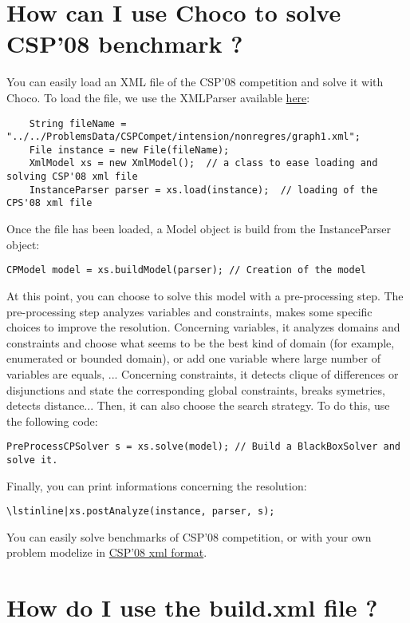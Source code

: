 \section{How can I use Choco to solve CSP'08 benchmark ?}\label{faq:howcaniusechocotosolvecsp'08benchmark}\hypertarget{faq:howcaniusechocotosolvecsp'08benchmark}{}
You can easily load an XML file of the CSP'08 competition and solve it with Choco.
To load the file, we use the XMLParser available \href{http://www.cril.univ-artois.fr/\~{}lecoutre/research/tools/tools.html}{here}:
\begin{lstlisting}
	String fileName = "../../ProblemsData/CSPCompet/intension/nonregres/graph1.xml";
	File instance = new File(fileName);
	XmlModel xs = new XmlModel();  // a class to ease loading and solving CSP'08 xml file
	InstanceParser parser = xs.load(instance);  // loading of the CPS'08 xml file
\end{lstlisting}
Once the file has been loaded, a Model object is build from the InstanceParser object:
\begin{lstlisting}
CPModel model = xs.buildModel(parser); // Creation of the model
\end{lstlisting}
At this point, you can choose to solve this model with a pre-processing step.
The pre-processing step analyzes variables and constraints, makes some specific choices to improve the resolution.
Concerning variables, it analyzes domains and constraints and choose what seems to be the best kind of domain (for example, enumerated or bounded domain), or add one variable where large number of variables are equals, ...
Concerning constraints, it detects clique of differences or disjunctions and state the corresponding global constraints, breaks symetries, detects distance...
Then, it can also choose the search strategy.
To do this, use the following code:
\begin{lstlisting}
PreProcessCPSolver s = xs.solve(model); // Build a BlackBoxSolver and solve it.
\end{lstlisting}
Finally, you can print informations concerning the resolution:
\begin{lstlisting}
\lstinline|xs.postAnalyze(instance, parser, s);
\end{lstlisting}

You can easily solve benchmarks of CSP'08 competition, or with your own problem modelize in \href{http://www.cril.univ-artois.fr/cpai08/xcsp21.pdf}{CSP'08 xml format}.

\section{How do I use the build.xml file ?}\label{faq:howdoiusethebuild.xmlfile}\hypertarget{faq:howdoiusethebuild.xmlfile}{}

